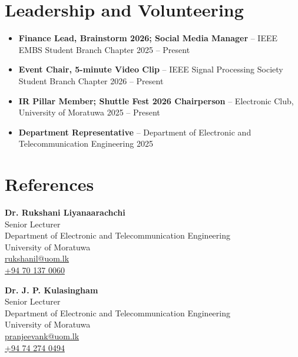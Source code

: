 \documentclass[10pt,a4paper]{article}
\begin{document}
\section*{Leadership and Volunteering}
\begin{itemize}
    \item \textbf{Finance Lead, Brainstorm 2026; Social Media Manager} -- IEEE EMBS Student Branch Chapter
    \hfill 2025 -- Present
    \item \textbf{Event Chair, 5-minute Video Clip} -- IEEE Signal Processing Society Student Branch Chapter
    \hfill 2026 -- Present
    \item \textbf{IR Pillar Member; Shuttle Fest 2026 Chairperson} -- Electronic Club, University of Moratuwa
    \hfill 2025 -- Present
    \item \textbf{Department Representative} -- Department of Electronic and Telecommunication Engineering
    \hfill 2025
\end{itemize}

\section*{References}

\begin{minipage}[t]{0.48\textwidth}
\textbf{Dr. Rukshani Liyanaarachchi}\\
Senior Lecturer\\
Department of Electronic and Telecommunication Engineering\\
University of Moratuwa\\
\href{mailto:rukshanil@uom.lk}{rukshanil@uom.lk}\\
\href{tel:+94701370060}{+94 70 137 0060}
\end{minipage}
\hfill
\begin{minipage}[t]{0.48\textwidth}
\textbf{Dr. J. P. Kulasingham}\\
Senior Lecturer\\
Department of Electronic and Telecommunication Engineering\\
University of Moratuwa\\
\href{mailto:pranjeevank@uom.lk}{pranjeevank@uom.lk}\\
\href{tel:+94742740494}{+94 74 274 0494}
\end{minipage}
\end{document}
